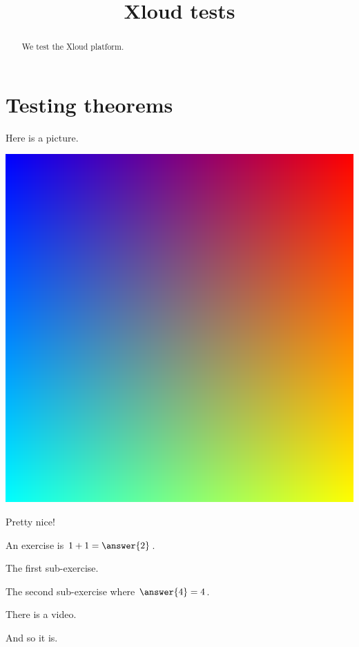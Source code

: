 \documentclass{ximera}
\title{Xloud tests}
\begin{document}
\begin{abstract}
  We test the Xloud platform.
\end{abstract}
\maketitle
 
\section{Testing theorems}

Here is a picture.

\includegraphics[scale=0.25]{sample.png}

Pretty nice!

\begin{exercise}
  An exercise is $1+1 = \answer{2}$.
  
  \begin{exercise}
    The first sub-exercise.
  \end{exercise}

  \begin{exercise}
    The second sub-exercise where $\answer{4} = 4$.
  \end{exercise}  
\end{exercise}

There is a video.


And so it is.
 
\end{document}
